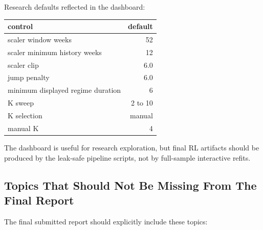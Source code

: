 Research defaults reflected in the dashboard:

{\def\LTcaptype{none} %
\begin{longtable}[]{@{}lr@{}}
\toprule\noalign{}
control & default \\
\midrule\noalign{}
\endhead
\bottomrule\noalign{}
\endlastfoot
scaler window weeks & 52 \\
scaler minimum history weeks & 12 \\
scaler clip & 6.0 \\
jump penalty & 6.0 \\
minimum displayed regime duration & 6 \\
K sweep & 2 to 10 \\
K selection & manual \\
manual K & 4 \\
\end{longtable}
}

The dashboard is useful for research exploration, but final RL artifacts
should be produced by the leak-safe pipeline scripts, not by full-sample
interactive refits.

\subsection{Topics That Should Not Be Missing From The Final
Report}\label{topics-that-should-not-be-missing-from-the-final-report}

The final submitted report should explicitly include these topics:

